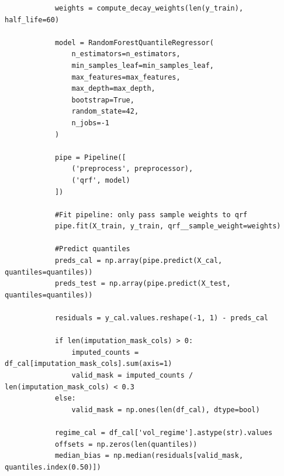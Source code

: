 \documentclass[
  a4paper,
  DIV=11,
  numbers=noendperiod]{scrreprt}
\begin{document}
\begin{verbatim}
            weights = compute_decay_weights(len(y_train), half_life=60)

            model = RandomForestQuantileRegressor(
                n_estimators=n_estimators,
                min_samples_leaf=min_samples_leaf,
                max_features=max_features,
                max_depth=max_depth,
                bootstrap=True,
                random_state=42,
                n_jobs=-1
            )

            pipe = Pipeline([
                ('preprocess', preprocessor),
                ('qrf', model)
            ])

            #Fit pipeline: only pass sample weights to qrf
            pipe.fit(X_train, y_train, qrf__sample_weight=weights)

            #Predict quantiles
            preds_cal = np.array(pipe.predict(X_cal, quantiles=quantiles))
            preds_test = np.array(pipe.predict(X_test, quantiles=quantiles))

            residuals = y_cal.values.reshape(-1, 1) - preds_cal

            if len(imputation_mask_cols) > 0:
                imputed_counts = df_cal[imputation_mask_cols].sum(axis=1)
                valid_mask = imputed_counts / len(imputation_mask_cols) < 0.3
            else:
                valid_mask = np.ones(len(df_cal), dtype=bool)

            regime_cal = df_cal['vol_regime'].astype(str).values
            offsets = np.zeros(len(quantiles))
            median_bias = np.median(residuals[valid_mask, quantiles.index(0.50)])


\end{verbatim}
\end{document}
